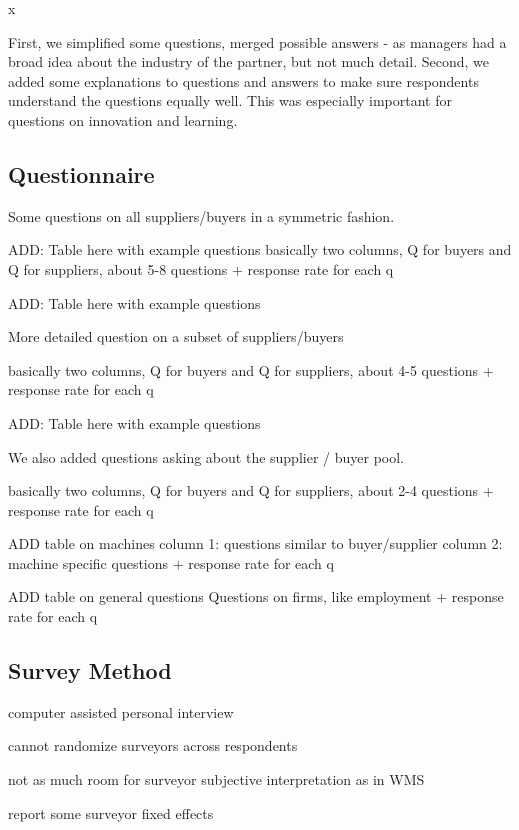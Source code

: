 x\documentclass[final, dvipsnames, authoryear,12pt]{elsarticle}
\begin{document}
First, we simplified some questions, merged possible answers - as managers had a broad idea about the industry of the partner, but not much detail. Second, we added some explanations to questions and answers to make sure respondents understand the questions equally well. This was especially important for questions on innovation and learning. 

\subsection{Questionnaire}

Some questions on all suppliers/buyers in a symmetric fashion. 

ADD: Table here with example questions
basically two columns, Q for buyers and Q for suppliers, about 5-8 questions
+ response rate for each q

ADD: Table here with example questions

More detailed question on a subset of suppliers/buyers 

basically two columns, Q for buyers and Q for suppliers, about 4-5 questions
+ response rate for each q

ADD: Table here with example questions

We also added questions asking about the supplier / buyer pool. 

basically two columns, Q for buyers and Q for suppliers, about 2-4 questions
+ response rate for each q



ADD table on machines
column 1: questions similar to buyer/supplier
column 2: machine specific questions
+ response rate for each q


ADD table on general questions
Questions on firms, like employment
+ response rate for each q

\subsection{Survey Method}

computer assisted personal interview

cannot randomize surveyors across respondents

not as much room for surveyor subjective interpretation as in WMS

report some surveyor fixed effects
\end{document}
